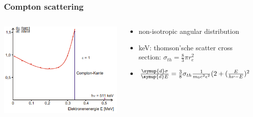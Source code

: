 \documentclass[aspectratio=1610, 9pt]{beamer}
\begin{document}
\begin{frame}\frametitle{Compton scattering}
  \begin{columns}
    \begin{column}[c]{0.48\textwidth}
      \includegraphics[width=\textwidth]{plots/compton_kante.png}
    \end{column}
    \begin{column}[c]{0.48\textwidth}
      \begin{itemize}
        \item non-isotropic angular distribution
        \item keV: thomson'sche scatter cross section: $\sigma_{th} = \frac{8}{3}\pi r_e^2$
        \item $\frac{\symup{d}\sigma}{\symup{d}E} = \frac{3}{8}\sigma_{th}\frac{1}{m_0 c^2 \epsilon^2}
        (2 + (\frac{E}{h\nu - E})^2(\frac{1}{\epsilon^2} + \frac{h\nu - E}{h\nu}-\frac{2}{\epsilon}(\frac{h\nu - E}{h\nu})))$
      \end{itemize}
    \end{column}
  \end{columns}
\end{frame}
\end{document}
